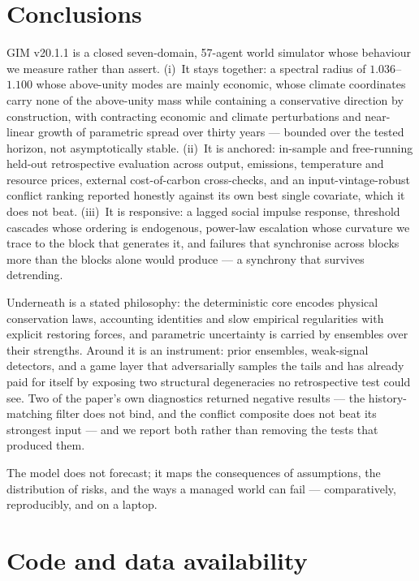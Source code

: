 \documentclass[12pt,a4paper]{article}
\newcommand{\Version}{v20.1.1}
\newcommand{\rhoA}{1.036} \newcommand{\rhoB}{1.100} \newcommand{\rhoC}{1.041}
\begin{document}
\section{Conclusions}

GIM \Version{} is a closed seven-domain, 57-agent world simulator whose behaviour we measure
rather than assert. (i)~It stays together: a spectral radius of $\rhoA$--$\rhoB$ whose
above-unity modes are mainly economic, whose climate coordinates carry none of the above-unity
mass while containing a conservative direction by construction, with contracting economic and
climate perturbations and near-linear growth of parametric spread over thirty years --- bounded
over the tested horizon, not asymptotically stable. (ii)~It is anchored: in-sample and
free-running held-out retrospective evaluation across output, emissions, temperature and
resource prices, external cost-of-carbon cross-checks, and an input-vintage-robust conflict
ranking reported honestly against its own best single covariate, which it does not beat.
(iii)~It is responsive: a lagged social impulse response, threshold cascades whose ordering is
endogenous, power-law escalation whose curvature we trace to the block that generates it, and
failures that synchronise across blocks more than the blocks alone would produce ---
a synchrony that survives detrending.

Underneath is a stated philosophy: the deterministic core encodes physical conservation laws,
accounting identities and slow empirical regularities with explicit restoring forces, and
parametric uncertainty is carried by ensembles over their strengths. Around it is an
instrument: prior ensembles, weak-signal detectors, and a game layer that adversarially samples
the tails and has already paid for itself by exposing two structural degeneracies no
retrospective test could see. Two of the paper's own diagnostics returned negative results ---
the history-matching filter does not bind, and the conflict composite does not beat its
strongest input --- and we report both rather than removing the tests that produced them.

The model does not forecast; it maps the consequences of assumptions, the distribution of
risks, and the ways a managed world can fail --- comparatively, reproducibly, and on a laptop.

\section*{Code and data availability}
\end{document}
